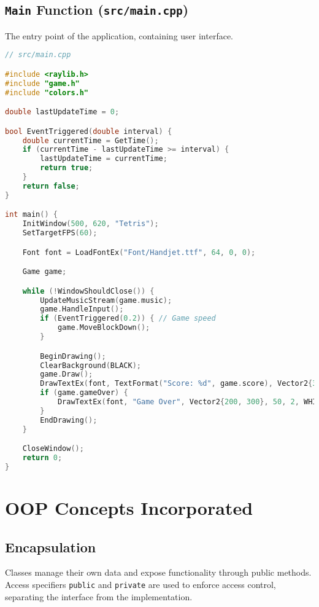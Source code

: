 \documentclass{article}
\begin{document}
\subsection{\texttt{Main} Function (\texttt{src/main.cpp})}

The entry point of the application, containing user interface.

\begin{lstlisting}[language=C++]
// src/main.cpp

#include <raylib.h>
#include "game.h"
#include "colors.h"

double lastUpdateTime = 0;

bool EventTriggered(double interval) {
    double currentTime = GetTime();
    if (currentTime - lastUpdateTime >= interval) {
        lastUpdateTime = currentTime;
        return true;
    }
    return false;
}

int main() {
    InitWindow(500, 620, "Tetris");
    SetTargetFPS(60);

    Font font = LoadFontEx("Font/Handjet.ttf", 64, 0, 0);

    Game game;

    while (!WindowShouldClose()) {
        UpdateMusicStream(game.music);
        game.HandleInput();
        if (EventTriggered(0.2)) { // Game speed
            game.MoveBlockDown();
        }

        BeginDrawing();
        ClearBackground(BLACK);
        game.Draw();
        DrawTextEx(font, TextFormat("Score: %d", game.score), Vector2{310, 200}, 30, 2, WHITE);
        if (game.gameOver) {
            DrawTextEx(font, "Game Over", Vector2{200, 300}, 50, 2, WHITE);
        }
        EndDrawing();
    }

    CloseWindow();
    return 0;
}
\end{lstlisting}

\section{OOP Concepts Incorporated}

\subsection{Encapsulation}

Classes manage their own data and expose functionality through public methods. Access specifiers \texttt{public} and \texttt{private} are used to enforce access control, separating the interface from the implementation.
\end{document}
